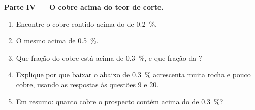 \begin{problem}
\noindent\textbf{Parte IV --- O cobre acima do teor de corte.}
\begin{enumerate}[resume]
  \item Encontre o cobre contido acima do  de \qty{0.2}{\percent}.
  \item O mesmo acima de \qty{0.5}{\percent}.
  \item Que fração do cobre está acima de \qty{0.3}{\percent}, e que fração da
        ?
  \item Explique por que baixar o  abaixo de \qty{0.3}{\percent} acrescenta muita rocha e pouco
        cobre, usando as respostas às questões 9 e 20.
  \item Em resumo: quanto cobre o prospecto contém acima do  de \qty{0.3}{\percent}?
\end{enumerate}
\end{problem}
